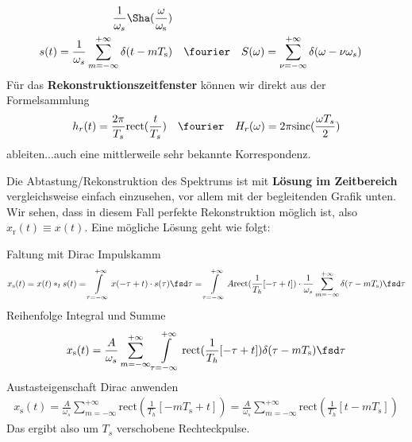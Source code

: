 \begin{ExCalc}
\begin{align}
\frac{1}{\omega_s}\Sha(\frac{\omega}{\omega_\mathrm{s}})\\
s(t) = \frac{1}{\omega_s} \sum_{m=-\infty}^{+\infty} \delta(t-m T_\mathrm{s}) &\quad\fourier\quad
S(\omega) = \sum_{\nu=-\infty}^{+\infty} \delta(\omega-\nu \omega_s)
\end{align}
%
Für das \textbf{Rekonstruktionszeitfenster} können wir direkt aus der Formelsammlung
\begin{align}
h_r(t) = \frac{2\pi}{T_s}\mathrm{rect}(\frac{t}{T_s})
\quad\fourier\quad
H_r(\omega) = 2\pi \mathrm{sinc}(\frac{\omega T_s}{2})
\end{align}
ableiten...auch eine mittlerweile sehr bekannte Korrespondenz.
%
\end{ExCalc}
\begin{Loesung}
%
Die Abtastung/Rekonstruktion des Spektrums ist mit \textbf{Lösung im Zeitbereich}
vergleichsweise einfach einzusehen, vor allem mit der begleitenden Grafik unten.
Wir sehen, dass in diesem Fall perfekte Rekonstruktion möglich ist, also
$x_\mathrm{r}(t) \equiv x(t)$. Eine mögliche Lösung geht wie folgt:

\noindent Faltung mit Dirac Impulskamm
\begin{align}
x_\mathrm{s}(t) = x(t) \ast_t s(t) = \int\limits_{\tau = -\infty}^{+\infty} x(-\tau+t) \cdot s(\tau) \fsd\tau
= \int\limits_{\tau = -\infty}^{+\infty} A \mathrm{rect}(\frac{1}{T_h}[-\tau + t]) \cdot \frac{1}{\omega_s} \sum_{m=-\infty}^{+\infty} \delta(\tau-m T_\mathrm{s}) \fsd\tau
\end{align}
Reihenfolge Integral und Summe
\begin{align}
x_\mathrm{s}(t) = \frac{A}{\omega_s} \sum_{m=-\infty}^{+\infty} \int\limits_{\tau = -\infty}^{+\infty} \mathrm{rect}(\frac{1}{T_h}[-\tau + t]) \delta(\tau-m T_\mathrm{s}) \fsd\tau
\end{align}
Austasteigenschaft Dirac anwenden
\begin{align}
x_\mathrm{s}(t)
= \frac{A}{\omega_s} \sum_{m=-\infty}^{+\infty} \mathrm{rect}(\frac{1}{T_h}[-m T_\mathrm{s} + t])
= \frac{A}{\omega_s} \sum_{m=-\infty}^{+\infty} \mathrm{rect}(\frac{1}{T_h}[t - m T_\mathrm{s}])
\end{align}
Das ergibt also um $T_s$ verschobene Rechteckpulse.


\end{Loesung}
